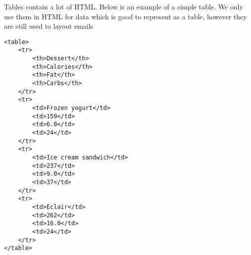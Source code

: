 Tables contain a lot of HTML. Below is an example of a simple table. We only use them in HTML for data which is good to represent as a table, however they are still used to layout emails

\begin{verbatim}
<table>
	<tr>
		<th>Dessert</th>
		<th>Calories</th>
		<th>Fat</th>
		<th>Carbs</th>
	</tr>
	<tr>
		<td>Frozen yogurt</td>
		<td>159</td>
		<td>6.0</td>
		<td>24</td>
	</tr>
	<tr>
		<td>Ice cream sandwich</td>
		<td>237</td>
		<td>9.0</td>
		<td>37</td>
	</tr>
	<tr>
		<td>Eclair</td>
		<td>262</td>
		<td>16.0</td>
		<td>24</td>
	</tr>
</table>
\end{verbatim}
